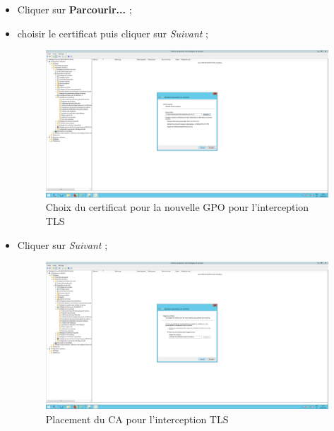 \begin{itemize}
\item Cliquer sur \textbf{Parcourir...} ;
\item choisir le certificat puis cliquer sur \textit{Suivant} ;
\begin{figure}[h!]
    \begin{center}
        \includegraphics[scale=0.20]{Interception_Screenshots/GPO6.png}
        \caption{Choix du certificat pour la nouvelle GPO pour l'interception TLS}
    \end{center}
\end{figure}
\FloatBarrier 

\item Cliquer sur \textit{Suivant} ;
\begin{figure}[h!]
    \begin{center}
        \includegraphics[scale=0.20]{Interception_Screenshots/GPO7.png}
        \caption{Placement du CA pour l'interception TLS}
    \end{center}
\end{figure}
\FloatBarrier 


\end{itemize}
